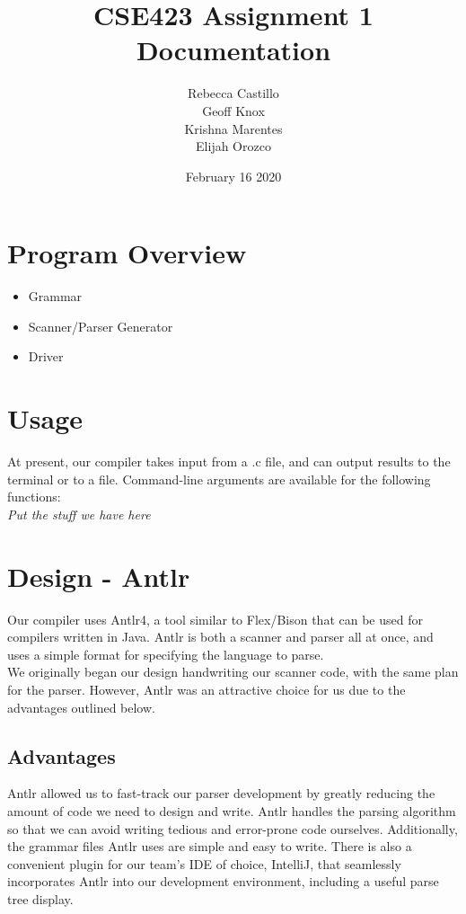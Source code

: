 \documentclass{article}
\title{CSE423 Assignment 1 Documentation}
\author{Rebecca Castillo\\Geoff Knox\\Krishna Marentes\\Elijah Orozco}
\date{February 16 2020}
\begin{document}
\maketitle

\section{Program Overview}
\begin{itemize}
    \item Grammar
    \item Scanner/Parser Generator
    \item Driver
\end{itemize}

\section{Usage}
At present, our compiler takes input from a .c file, and can output results to the terminal or to a file. Command-line arguments are available for the following functions:\\
\textit{Put the stuff we have here}

\section{Design - Antlr}
Our compiler uses Antlr4, a tool similar to Flex/Bison that can be used for compilers written in Java. Antlr is both a scanner and parser all at once, and uses a simple format for specifying the language to parse.\\
We originally began our design handwriting our scanner code, with the same plan for the parser. However, Antlr was an attractive choice for us due to the advantages outlined below.
\subsection{Advantages}
Antlr allowed us to fast-track our parser development by greatly reducing the amount of code we need to design and write. Antlr handles the parsing algorithm so that we can avoid writing tedious and error-prone code ourselves. Additionally, the grammar files Antlr uses are simple and easy to write. There is also a convenient plugin for our team's IDE of choice, IntelliJ, that seamlessly incorporates Antlr into our development environment, including a useful parse tree display.
\end{document}
